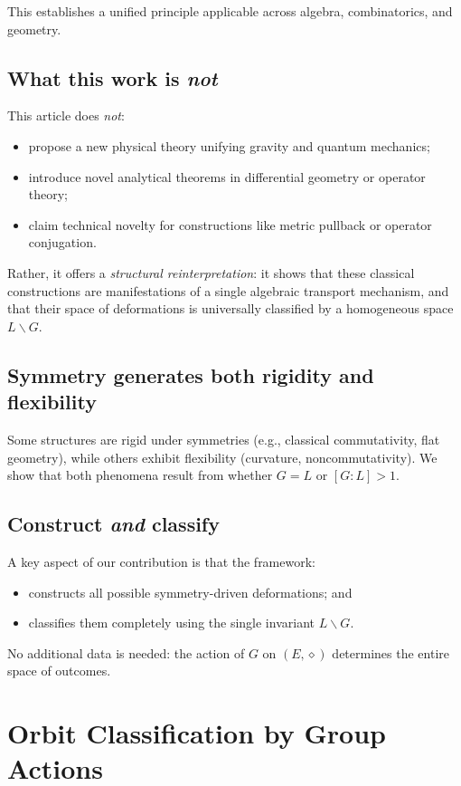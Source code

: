 \documentclass[11pt,a4paper]{article}
\begin{document}
	This establishes a unified principle applicable across algebra, combinatorics, and geometry.
	
	\subsection*{What this work is \emph{not}}
	This article does \emph{not}:
	\begin{itemize}
		\item propose a new physical theory unifying gravity and quantum mechanics;
		\item introduce novel analytical theorems in differential geometry or operator theory;
		\item claim technical novelty for constructions like metric pullback or operator conjugation.
	\end{itemize}
	Rather, it offers a \emph{structural reinterpretation}: it shows that these classical constructions are manifestations of a single algebraic transport mechanism, and that their space of deformations is universally classified by a homogeneous space $L\backslash G$.
	
	\subsection*{Symmetry generates both rigidity and flexibility}
	
	Some structures are rigid under symmetries (e.g., classical commutativity, flat geometry), while others exhibit flexibility (curvature, noncommutativity). We show that both phenomena result from whether $G = L$ or $[G : L] > 1$.
	
	\subsection*{Construct \emph{and} classify}
	
	A key aspect of our contribution is that the framework:
	\begin{itemize}
		\item constructs all possible symmetry-driven deformations; and
		\item classifies them completely using the single invariant $L\backslash G$.
	\end{itemize}
	No additional data is needed: the action of $G$ on $(E, \diamond)$ determines the entire space of outcomes.
	
	\section{Orbit Classification by Group Actions}
	
\end{document}
